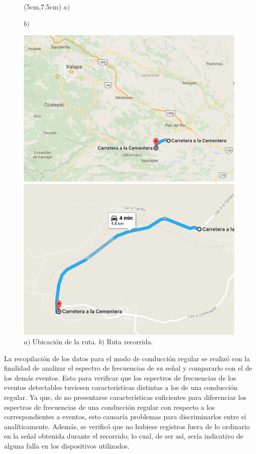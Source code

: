 \begin{figure}[H]
\begin{textblock*}{190mm}(5cm,7.5cm)
$a)$

\vspace{6.8cm}

$b)$
\end{textblock*}
\centering
\includegraphics[scale=0.49]{Captura2.png}

\includegraphics[scale=0.534]{Captura1.png}
\caption{$a)$ Ubicación de la ruta. $b)$ Ruta recorrida.}
\label{ruta}
\end{figure}

La recopilación de los datos para el modo de conducción regular se realizó con la finalidad de analizar el espectro de frecuencias de su señal y compararlo con el de los demás eventos. 
Esto para verificar que los espectros de frecuencias de los eventos detectables tuviesen características distintas a los de una conducción regular. 
Ya que, de no presentarse características suficientes para diferenciar los espectros de frecuencias de una conducción regular con respecto a los correspondientes a eventos, esto causaría problemas para discriminarlos entre sí analíticamente. 
Además, se verificó que no hubiese registros fuera de lo ordinario en la señal obtenida durante el recorrido; lo cual, de ser así, sería indicativo de alguna falla en los dispositivos utilizados.

